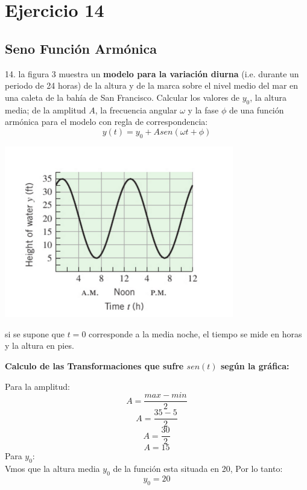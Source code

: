\chapter*{Ejercicio 14}
\section*{Seno Función Armónica}

14. la figura 3 muestra un \textbf{modelo para la variación diurna} (i.e. durante un periodo de 24 horas) de la altura y de la marca sobre el  nivel medio del mar en una caleta de la bahía de San Francisco. Calcular los valores de $y_{0}$, la altura media; de la amplitud $A$, la frecuencia angular $\omega$ y la fase $\phi$ de una función armónica para el modelo con regla de correspondencia: \\
\[
y(t) = y_{0} + Asen(\omega t + \phi)
\]

\begin{center}
     \includegraphics[width=10cm]{recursos/Grafica_seno.png}\par
\end{center}
si se supone que $t = 0$ corresponde a la media noche, el tiempo se mide en horas y la altura en pies.

\begin{center}
    \textbf{Calculo de las Transformaciones que sufre $sen(t)$ según la gráfica:}
\end{center}

Para la amplitud:
 \[
 A = \frac{max -min}{2}
 \]
\[
 A = \frac{35-5}{2}
 \]
 \[
 A = \frac{30}{2}
 \]
 \[
 A = 15
 \]
 Para $y_{0}$: \\
 Vmos que la altura media $y_{0}$ de la función esta situada en 20, Por lo tanto:\\
 \[
 y_{0} = 20
 \]

